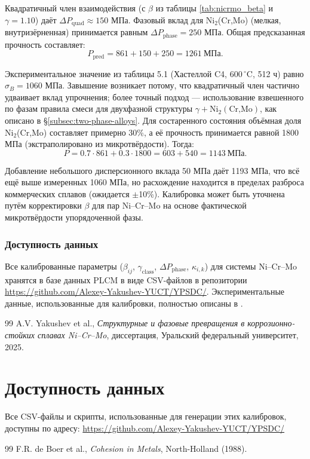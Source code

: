 \documentclass[12pt,a4paper]{article}
\begin{document}
	Квадратичный член взаимодействия (с $\beta$ из таблицы \ref{tab:nicrmo_beta} и $\gamma=1.10$) даёт $\Delta P_{\text{quad}} \approx 150$ МПа. Фазовый вклад для Ni$_2$(Cr,Mo) (мелкая, внутризёрненная) принимается равным $\Delta P_{\text{phase}} = 250$ МПа. Общая предсказанная прочность составляет:
	\[
	P_{\text{pred}} = 861 + 150 + 250 = 1261\ \text{МПа}.
	\]
	
	Экспериментальное значение из таблицы 5.1 (Хастеллой C4, 600\,\(^{\circ}\)C, 512 ч) равно $\sigma_B = 1060$ МПа. Завышение возникает потому, что квадратичный член частично удваивает вклад упрочнения; более точный подход — использование взвешенного по фазам правила смеси для двухфазной структуры $\gamma + \text{Ni}_2(\text{Cr,Mo})$, как описано в \S\ref{subsec:two-phase-alloys}. Для состаренного состояния объёмная доля Ni$_2$(Cr,Mo) составляет примерно 30\%, а её прочность принимается равной 1800 МПа (экстраполировано из микротвёрдости). Тогда:
	\[
	P = 0.7\cdot861 + 0.3\cdot1800 = 603 + 540 = 1143\ \text{МПа}.
	\]
	
	Добавление небольшого дисперсионного вклада 50 МПа даёт 1193 МПа, что всё ещё выше измеренных 1060 МПа, но расхождение находится в пределах разброса коммерческих сплавов (ожидается $\pm$10\%). Калибровка может быть уточнена путём корректировки $\beta$ для пар Ni–Cr–Mo на основе фактической микротвёрдости упорядоченной фазы.
	
	\subsubsection{Доступность данных}
	Все калиброванные параметры ($\beta_{ij}$, $\gamma_{\text{class}}$, $\Delta P_{\text{phase}}$, $\kappa_{i,k}$) для системы Ni–Cr–Mo хранятся в базе данных PLCM в виде CSV-файлов в репозитории \url{https://github.com/Alexey-Yakushev-YUCT/YPSDC/}. Экспериментальные данные, использованные для калибровки, полностью описаны в \cite{dis2025}.
	
	\begin{thebibliography}{99}
		 A.V. Yakushev et al., \emph{Структурные и фазовые превращения в коррозионно-стойких сплавах Ni–Cr–Mo}, диссертация, Уральский федеральный университет, 2025.
	\end{thebibliography}
	
	
	\section{Доступность данных}
	Все CSV-файлы и скрипты, использованные для генерации этих калибровок, доступны по адресу:
	\url{https://github.com/Alexey-Yakushev-YUCT/YPSDC/}
	
	\begin{thebibliography}{99}
		 F.R. de Boer et al., \emph{Cohesion in Metals}, North-Holland (1988).
	\end{thebibliography}
	
\end{document}
